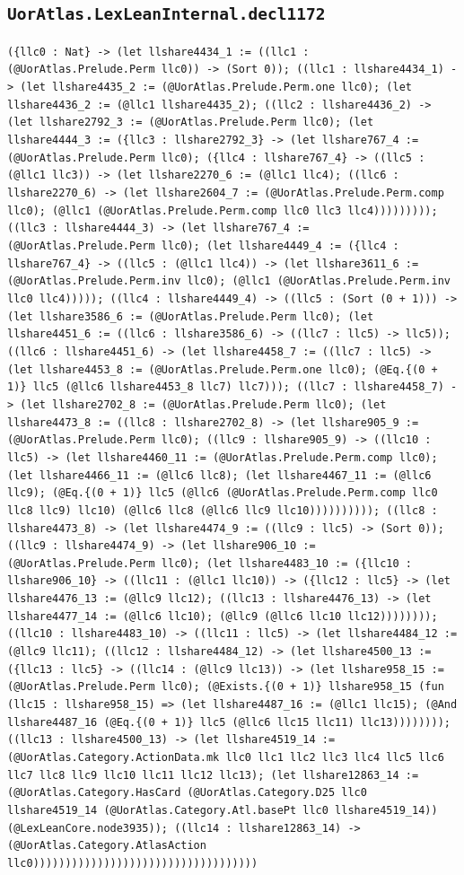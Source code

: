 \documentclass[11pt]{article}
\begin{document}
\subsection*{\texttt{UorAtlas.LexLeanInternal.decl1172}}
\noindent\texttt{(\{llc0 : Nat\} -> (let llshare4434\_1 := ((llc1 : (@UorAtlas.Prelude.Perm llc0)) -> (Sort 0)); ((llc1 : llshare4434\_1) -> (let llshare4435\_2 := (@UorAtlas.Prelude.Perm.one llc0); (let llshare4436\_2 := (@llc1 llshare4435\_2); ((llc2 : llshare4436\_2) -> (let llshare2792\_3 := (@UorAtlas.Prelude.Perm llc0); (let llshare4444\_3 := (\{llc3 : llshare2792\_3\} -> (let llshare767\_4 := (@UorAtlas.Prelude.Perm llc0); (\{llc4 : llshare767\_4\} -> ((llc5 : (@llc1 llc3)) -> (let llshare2270\_6 := (@llc1 llc4); ((llc6 : llshare2270\_6) -> (let llshare2604\_7 := (@UorAtlas.Prelude.Perm.comp llc0); (@llc1 (@UorAtlas.Prelude.Perm.comp llc0 llc3 llc4))))))))); ((llc3 : llshare4444\_3) -> (let llshare767\_4 := (@UorAtlas.Prelude.Perm llc0); (let llshare4449\_4 := (\{llc4 : llshare767\_4\} -> ((llc5 : (@llc1 llc4)) -> (let llshare3611\_6 := (@UorAtlas.Prelude.Perm.inv llc0); (@llc1 (@UorAtlas.Prelude.Perm.inv llc0 llc4))))); ((llc4 : llshare4449\_4) -> ((llc5 : (Sort (0 + 1))) -> (let llshare3586\_6 := (@UorAtlas.Prelude.Perm llc0); (let llshare4451\_6 := ((llc6 : llshare3586\_6) -> ((llc7 : llc5) -> llc5)); ((llc6 : llshare4451\_6) -> (let llshare4458\_7 := ((llc7 : llc5) -> (let llshare4453\_8 := (@UorAtlas.Prelude.Perm.one llc0); (@Eq.\{(0 + 1)\} llc5 (@llc6 llshare4453\_8 llc7) llc7))); ((llc7 : llshare4458\_7) -> (let llshare2702\_8 := (@UorAtlas.Prelude.Perm llc0); (let llshare4473\_8 := ((llc8 : llshare2702\_8) -> (let llshare905\_9 := (@UorAtlas.Prelude.Perm llc0); ((llc9 : llshare905\_9) -> ((llc10 : llc5) -> (let llshare4460\_11 := (@UorAtlas.Prelude.Perm.comp llc0); (let llshare4466\_11 := (@llc6 llc8); (let llshare4467\_11 := (@llc6 llc9); (@Eq.\{(0 + 1)\} llc5 (@llc6 (@UorAtlas.Prelude.Perm.comp llc0 llc8 llc9) llc10) (@llc6 llc8 (@llc6 llc9 llc10)))))))))); ((llc8 : llshare4473\_8) -> (let llshare4474\_9 := ((llc9 : llc5) -> (Sort 0)); ((llc9 : llshare4474\_9) -> (let llshare906\_10 := (@UorAtlas.Prelude.Perm llc0); (let llshare4483\_10 := (\{llc10 : llshare906\_10\} -> ((llc11 : (@llc1 llc10)) -> (\{llc12 : llc5\} -> (let llshare4476\_13 := (@llc9 llc12); ((llc13 : llshare4476\_13) -> (let llshare4477\_14 := (@llc6 llc10); (@llc9 (@llc6 llc10 llc12)))))))); ((llc10 : llshare4483\_10) -> ((llc11 : llc5) -> (let llshare4484\_12 := (@llc9 llc11); ((llc12 : llshare4484\_12) -> (let llshare4500\_13 := (\{llc13 : llc5\} -> ((llc14 : (@llc9 llc13)) -> (let llshare958\_15 := (@UorAtlas.Prelude.Perm llc0); (@Exists.\{(0 + 1)\} llshare958\_15 (fun (llc15 : llshare958\_15) => (let llshare4487\_16 := (@llc1 llc15); (@And llshare4487\_16 (@Eq.\{(0 + 1)\} llc5 (@llc6 llc15 llc11) llc13)))))))); ((llc13 : llshare4500\_13) -> (let llshare4519\_14 := (@UorAtlas.Category.ActionData.mk llc0 llc1 llc2 llc3 llc4 llc5 llc6 llc7 llc8 llc9 llc10 llc11 llc12 llc13); (let llshare12863\_14 := (@UorAtlas.Category.HasCard (@UorAtlas.Category.D25 llc0 llshare4519\_14 (@UorAtlas.Category.Atl.basePt llc0 llshare4519\_14)) (@LexLeanCore.node3935)); ((llc14 : llshare12863\_14) -> (@UorAtlas.Category.AtlasAction llc0)))))))))))))))))))))))))))))))))))}\par
\end{document}
